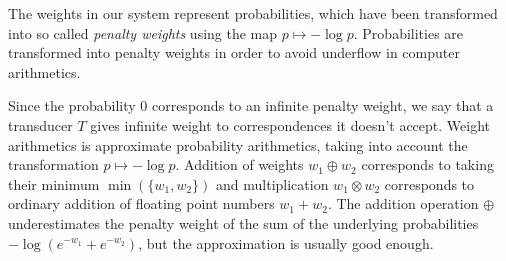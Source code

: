 \documentclass[a4paper,conference]{IEEEtran}
\begin{document}
The weights in our system represent probabilities, which have been
transformed into so called {\it penalty weights} using the map $p
\mapsto -\log p$. Probabilities are transformed into penalty weights
in order to avoid underflow in computer arithmetics. 

Since the probability $0$ corresponds to an infinite penalty weight,
we say that a transducer $T$ gives infinite weight to correspondences
it doesn't accept. Weight arithmetics is approximate probability
arithmetics, taking into account the transformation $p \mapsto -\log
p$. Addition of weights $w_1 \oplus w_2$ corresponds to taking their
minimum $\min(\{w_1,w_2\})$ and multiplication $w_1 \otimes w_2$
corresponds to ordinary addition of floating point numbers $w_1 +
w_2$. The addition operation $\oplus$ underestimates the penalty
weight of the sum of the underlying probabilities $-\log (e^{-w_1} +
e^{-w_2})$, but the approximation is usually good enough.
\end{document}
